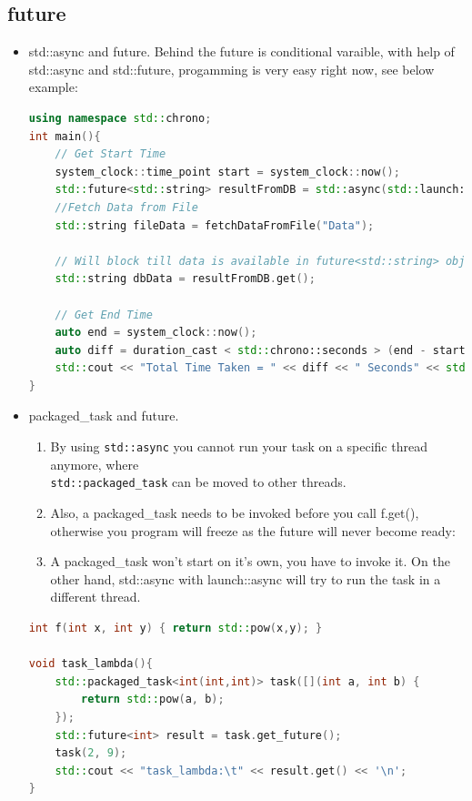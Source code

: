 \documentclass[a4paper,11pt,twoside]{book}
\begin{document}
\subsection{future}

\begin{itemize}
	\item std::async and future. Behind the future is conditional varaible, with help of std::async and std::future, progamming is very easy right now, see below example:
	
\begin{lstlisting}[frame=single, language=c++]
using namespace std::chrono;
int main(){
	// Get Start Time
	system_clock::time_point start = system_clock::now();
	std::future<std::string> resultFromDB = std::async(std::launch::async, fetchDataFromDB, "Data");
	//Fetch Data from File
	std::string fileData = fetchDataFromFile("Data");
	
	// Will block till data is available in future<std::string> object.
	std::string dbData = resultFromDB.get();
	
	// Get End Time
	auto end = system_clock::now();
	auto diff = duration_cast < std::chrono::seconds > (end - start).count();
	std::cout << "Total Time Taken = " << diff << " Seconds" << std::endl;
}
\end{lstlisting}	

\item packaged\_task and future. 
\begin{enumerate}
	\item By using \texttt{std::async} you cannot run your task on a specific thread anymore, where \\ \texttt{std::packaged\_task} can be moved to other threads.
	
	\item Also, a packaged\_task needs to be invoked before you call f.get(), otherwise you program will freeze as the future will never become ready:
	
	\item A packaged\_task won't start on it's own, you have to invoke it. On the other hand, std::async with launch::async will try to run the task in a different thread.	
	
\end{enumerate}

\begin{lstlisting}[frame=single, language=c++]
int f(int x, int y) { return std::pow(x,y); }

void task_lambda(){
	std::packaged_task<int(int,int)> task([](int a, int b) {
		return std::pow(a, b); 
	});
	std::future<int> result = task.get_future();
	task(2, 9);
	std::cout << "task_lambda:\t" << result.get() << '\n';
}


\end{lstlisting}
\end{itemize}
\end{document}
